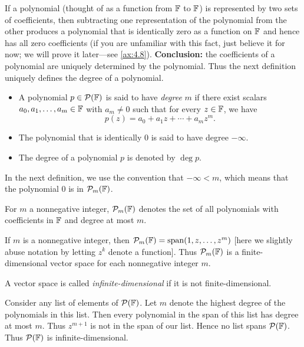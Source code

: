 If a polynomial (thought of as a function from $\mathbb{F}$ to $\mathbb{F}$) is represented by
two sets of coefficients, then subtracting one representation of the
polynomial from the other produces a polynomial that is identically zero as a
function on $\mathbb{F}$ and hence has all zero coefficients (if you are unfamiliar
with this fact, just believe it for now; we will prove it later---see
\ref{ax:4.8}). \textbf{Conclusion:} the coefficients of a polynomial are
uniquely determined by the polynomial. Thus the next definition uniquely
defines the degree of a polynomial.

\begin{definition}\label{ax:2.11}\leavevmode
\begin{itemize}
\item A polynomial $p\in\mathcal{P}(\mathbb{F})$ is said to have \emph{degree} $m$ if there
  exist scalars $a_0,a_1,\dots,a_m\in\mathbb{F}$ with $a_m\ne0$ such that for every
  $z\in\mathbb{F}$, we have
  \[ p(z) = a_0+a_1z+\cdots+a_mz^m. \]
\item The polynomial that is identically $0$ is said to have degree $-\infty$.
\item The degree of a polynomial $p$ is denoted by $\deg p$.
\end{itemize}
\end{definition}

In the next definition, we use the convention that $-\infty<m$, which means
that the polynomial $0$ is in $\Poly_m(\F)$.

\begin{notation}[$\Poly_m(\F)$]\label{ax:2.12}
For $m$ a nonnegative integer, $\Poly_m(\F)$ denotes the set of all polynomials
with coefficients in $\mathbb{F}$ and degree at most $m$.
\end{notation}

If $m$ is a nonnegative integer, then $\mathcal{P}_m(\mathbb{F})=\operatorname{span}(1,z,\dots,z^m)$ [here
we slightly abuse notation by letting $z^k$ denote a function]. Thus
$\Poly_m(\F)$ is a finite-dimensional vector space for each nonnegative integer
$m$.

\begin{definition}\label{ax:2.13}
A vector space is called \emph{infinite-dimensional} if it is not
finite-dimensional.
\end{definition}

\begin{example}\label{ax:2.14}
Consider any list of elements of $\mathcal{P}(\mathbb{F})$. Let $m$ denote the highest degree
of the polynomials in this list. Then every polynomial in the span of this list
has degree at most $m$. Thus $z^{m+1}$ is not in the span of our list. Hence no
list spans $\mathcal{P}(\mathbb{F})$. Thus $\mathcal{P}(\mathbb{F})$ is infinite-dimensional.
\end{example}

